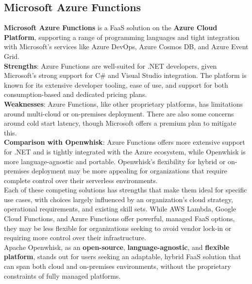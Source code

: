 \subsection{Microsoft Azure Functions}
\textbf{Microsoft Azure Functions} is a FaaS solution on the \textbf{Azure Cloud Platform}, supporting a range of programming languages and tight integration with Microsoft’s services like Azure DevOps, Azure Cosmos DB, and Azure Event Grid.\vspace{14pt}\\
\textbf{Strengths}: Azure Functions are well-suited for .NET developers, given Microsoft’s strong support for C\# and Visual Studio integration. The platform is known for its extensive developer tooling, ease of use, and support for both consumption-based and dedicated pricing plans.\vspace{14pt}\\
\textbf{Weaknesses}: Azure Functions, like other proprietary platforms, has limitations around multi-cloud or on-premises deployment. There are also some concerns around cold start latency, though Microsoft offers a premium plan to mitigate this.\vspace{14pt}\\
\textbf{Comparison with Openwhisk}: Azure Functions offers more extensive support for .NET and is tightly integrated with the Azure ecosystem, while Openwhisk is more language-agnostic and portable. Openwhisk’s flexibility for hybrid or on-premises deployment may be more appealing for organizations that require complete control over their serverless environments.\vspace{30pt}\\
Each of these competing solutions has strengths that make them ideal for specific use cases, with choices largely influenced by an organization’s cloud strategy, operational requirements, and existing skill sets. While AWS Lambda, Google Cloud Functions, and Azure Functions offer powerful, managed FaaS options, they may be less flexible for organizations seeking to avoid vendor lock-in or requiring more control over their infrastructure.\vspace{14pt}\\
Apache Openwhisk, as an \textbf{open-source}, \textbf{language-agnostic}, and \textbf{flexible platform}, stands out for users seeking an adaptable, hybrid FaaS solution that can span both cloud and on-premises environments, without the proprietary constraints of fully managed platforms.